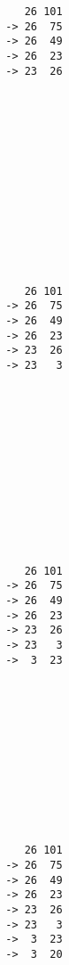 { \begin{verbatim}
                 26 101
              -> 26  75
              -> 26  49
              -> 26  23
              -> 23  26
              
              
              
              
              
              
              
              
              
              
              
              
              
\end{verbatim}}
{ \begin{verbatim}
                 26 101
              -> 26  75
              -> 26  49
              -> 26  23
              -> 23  26
              -> 23   3
              
              
              
              
              
              
              
              
              
              
              
              
\end{verbatim}}
{ \begin{verbatim}
                 26 101
              -> 26  75
              -> 26  49
              -> 26  23
              -> 23  26
              -> 23   3
              ->  3  23
              
              
              
              
              
              
              
              
              
              
              
\end{verbatim}}
{ \begin{verbatim}
                 26 101
              -> 26  75
              -> 26  49
              -> 26  23
              -> 23  26
              -> 23   3
              ->  3  23
              ->  3  20
              
              
              
              
              
              
              
              
              
              
\end{verbatim}}
